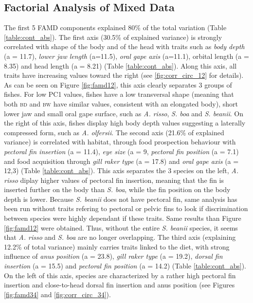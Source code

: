 
\subsection{Factorial Analysis of Mixed Data}

The first 5 FAMD components explained 80\% of the total variation (Table \ref{table:cont_abs}). The first axis (30.5\% of explained variance) is strongly correlated with shape of the body and of the head with traits such as \emph{body depth} (a = 11.7), \emph{lower jaw length} (a=11.5), \emph{oral gape axis} (a=11.1), orbital length (a = 8.35) and head length (a = 8.21) (Table \ref{table:cont_abs}). Along this axis, all traits have increasing values toward the right (see \ref{fig:corr_circ_12} for details). As can be seen on Figure \ref{fig:famd12}, this axis clearly separates 3 groups of fishes. For low PC1 values, fishes have a low transversal shape (meaning that both \textsc{bd} and \textsc{bw} have similar values, consistent with an elongated body), short lower jaw and small oral gape surface, such as \textit{A. risso}, \textit{S. boa} and \textit{S. beanii}. On the right of this axis, fishes display high body depth values suggesting a laterally compressed form, such as \textit{A. olfersii}. 
The second axis (21.6\% of explained variance) is correlated with habitat, through food prospection behaviour with \emph{pectoral fin insertion} (a = 11.4), \emph{eye size} (a = 9, \emph{pectoral fin position} (a = 7.1) and food acquisition through \emph{gill raker type} (a = 17.8) and \emph{oral gape axis} (a = 12,3) (Table \ref{table:cont_abs}). This axis separates the 3 species on the left, \textit{A. risso} diplay higher values of pectoral fin insertion, meaning that the fin is inserted further on the body than \textit{S. boa}, while the fin position on the body depth is lower. Because \textit{S. beanii} does not have pectoral fin, same analysis has been run without traits refering to pectoral or pelvic fins to look if discrimination between species were highly dependant if these traits. Same results than Figure \ref{fig:famd12} were obtained. Thus, without the entire \textit{S. beanii} species, it seems that \textit{A. risso} and \textit{S. boa} are no longer overlapping. 
The third axis (explaining 12.2\% of total variance) mainly carries traits linked to the diet, with strong influence of \emph{anus position} (a = 23.8), \emph{gill raker type} (a = 19.2), \emph{dorsal fin insertion} (a = 15.5) and \emph{pectoral fin position} (a = 14.2) (Table \ref{table:cont_abs}). On the left of this axis, species are characterized by a rather high pectoral fin insertion and close-to-head dorsal fin insertion and anus position (see Figures \ref{fig:famd34} and \ref{fig:corr_circ_34}).
